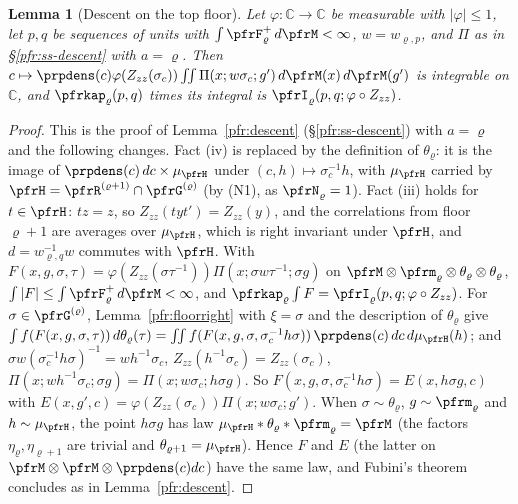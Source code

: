 \documentclass[10pt]{amsart}
\newtheorem{lemma}[theorem]{Lemma}
\theoremstyle{definition}
\theoremstyle{remark}
\newcommand{\C}{\mathbb C}
\begin{document}
\begin{lemma}[Descent on the top floor]\label{prp:topdescent}
Let $\varphi\colon\C\to\C$ be measurable with $|\varphi|\le1$, let $p,q$ be sequences of units with
$\int\pfrF^+_\varrho\,d\pfrM<\infty$, $w=w_{\varrho,p}$, and $\Pi$ as in \S\ref{pfr:ss-descent} with $a=\varrho$. Then
$c\mapsto\prpdens(c)\varphi(Z_{zz}(\sigma_c))\allowbreak \iint\Pi(x;w\sigma_c;g')\,d\pfrM(x)\,d\pfrM(g')$ is integrable on $\C$, and
$\pfrkap_\varrho(p,q)$ times its integral is $\pfrI_\varrho(p,q;\varphi\circ Z_{zz})$.
\end{lemma}
\begin{proof}
This is the proof of Lemma~\ref{pfr:descent} (\S\ref{pfr:ss-descent}) with $a=\varrho$ and the following changes. Fact
(iv) is replaced by the definition of $\theta_\varrho$: it is the image of $\prpdens(c)\,dc\times\mu_\pfrH$ under
$(c,h)\mapsto\sigma_c^{-1}h$, with $\mu_\pfrH$ carried by $\pfrH=\pfrR^{(\varrho+1)}\cap\pfrG^{(\varrho)}$ (by (N1), as
$\pfrN_\varrho=1$). Fact (iii) holds for $t\in\pfrH$: $tz=z$, so $Z_{zz}(tyt')=Z_{zz}(y)$, and the correlations from floor
$\varrho+1$ are averages over $\mu_\pfrH$, which is right invariant under $\pfrH$, and $d=w_{\varrho,q}^{-1}w$ commutes with
$\pfrH$. With $F(x,g,\sigma,\tau)=\varphi(Z_{zz}(\sigma\tau^{-1}))\Pi(x;\sigma w\tau^{-1};\sigma g)$ on
$\pfrM\otimes\pfrm_\varrho\otimes\theta_\varrho\otimes\theta_\varrho$, $\int|F|\le\int\pfrF^+_\varrho\,d\pfrM<\infty$, and
$\pfrkap_\varrho\int F=\pfrI_\varrho(p,q;\varphi\circ Z_{zz})$. For $\sigma\in\pfrG^{(\varrho)}$, Lemma~\ref{pfr:floorright}
with $\xi=\sigma$ and the description of $\theta_\varrho$ give $\int f(F(x,g,\sigma,\tau))\,d\theta_\varrho(\tau)=\iint
f(F(x,g,\sigma,\sigma_c^{-1}h\sigma))\,\prpdens(c)\,dc\,d\mu_\pfrH(h)$; and $\sigma w(\sigma_c^{-1}h\sigma)^{-1}=wh^{-1}\sigma_c$,
$Z_{zz}(h^{-1}\sigma_c)=Z_{zz}(\sigma_c)$, $\Pi(x;wh^{-1}\sigma_c;\sigma g)=\Pi(x;w\sigma_c;h\sigma g)$. So
$F(x,g,\sigma,\sigma_c^{-1}h\sigma)=E(x,h\sigma g,c)$ with $E(x,g',c)=\varphi(Z_{zz}(\sigma_c))\Pi(x;w\sigma_c;g')$. When
$\sigma\sim\theta_\varrho$, $g\sim\pfrm_\varrho$ and $h\sim\mu_\pfrH$, the point $h\sigma g$ has law
$\mu_\pfrH*\theta_\varrho*\pfrm_\varrho=\pfrM$ (the factors $\eta_\varrho,\eta_{\varrho+1}$ are trivial and
$\theta_{\varrho+1}=\mu_\pfrH$). Hence $F$ and $E$ (the latter on $\pfrM\otimes\pfrM\otimes\prpdens(c)dc$) have the same
law, and Fubini's theorem concludes as in Lemma~\ref{pfr:descent}.
\end{proof}
\end{document}
